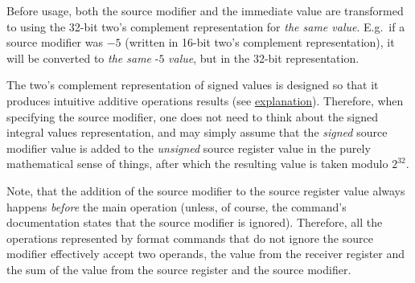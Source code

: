 Before usage, both the source modifier and the immediate value are transformed
to  using the 32-bit two's complement representation for
\textit{the same value}.
E.g.\ if a source modifier was $-5$ (written in 16-bit two's complement
representation), it will be converted to \textit{the same} $\textit{-5}$
\textit{value}, but in the 32-bit representation.

The two's complement representation of signed values is designed so that it
produces intuitive additive operations results
(see \href{https://en.wikipedia.org/wiki/Two\%27s_complement#Addition}
{explanation}).
Therefore, when specifying the source modifier, one does not need to think about
the signed integral values representation, and may simply assume that
the \textit{signed} source modifier value is added to the \textit{unsigned}
source register value in the purely mathematical sense of things, after which
the resulting value is taken modulo $2^{32}$.

Note, that the addition of the source modifier to the source register value
always happens \textit{before} the main operation (unless, of course,
the command's documentation states that the source modifier is ignored).
Therefore, all the operations represented by  format commands
that do not ignore the source modifier effectively accept two 
operands, the value from the receiver register and the sum of the value
from the source register and the source modifier.
